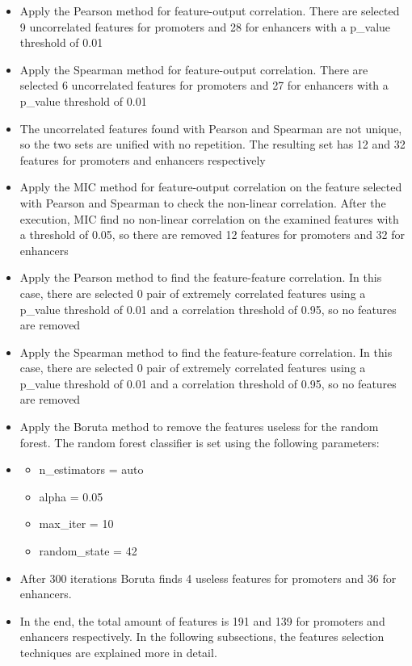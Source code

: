 \begin{itemize}
\item
  Apply the Pearson method for feature-output correlation. There are
  selected 9 uncorrelated features for promoters and 28 for enhancers
  with a p\_value threshold of 0.01
\item
  Apply the Spearman method for feature-output correlation. There are
  selected 6 uncorrelated features for promoters and 27 for enhancers
  with a p\_value threshold of 0.01
\item
  The uncorrelated features found with Pearson and Spearman are not
  unique, so the two sets are unified with no repetition. The resulting
  set has 12 and 32 features for promoters and enhancers respectively
\item
  Apply the MIC method for feature-output correlation on the feature
  selected with Pearson and Spearman to check the non-linear
  correlation. After the execution, MIC find no non-linear correlation
  on the examined features with a threshold of 0.05, so there are
  removed 12 features for promoters and 32 for enhancers
\item
  Apply the Pearson method to find the feature-feature correlation. In
  this case, there are selected 0 pair of extremely correlated features
  using a p\_value threshold of 0.01 and a correlation threshold of
  0.95, so no features are removed
\item
  Apply the Spearman method to find the feature-feature correlation. In
  this case, there are selected 0 pair of extremely correlated features
  using a p\_value threshold of 0.01 and a correlation threshold of
  0.95, so no features are removed
\item
  Apply the Boruta method to remove the features useless for the random
  forest. The random forest classifier is set using the following
  parameters:
\item
  \begin{itemize}
  \item
    n\_estimators = auto
  \item
    alpha = 0.05
  \item
    max\_iter = 10
  \item
    random\_state = 42
  \end{itemize}
\item
  After 300 iterations Boruta finds 4 useless features for promoters and
  36 for enhancers.
\item
  In the end, the total amount of features is 191 and 139 for promoters
  and enhancers respectively. In the following subsections, the features
  selection techniques are explained more in detail. 
\end{itemize}

